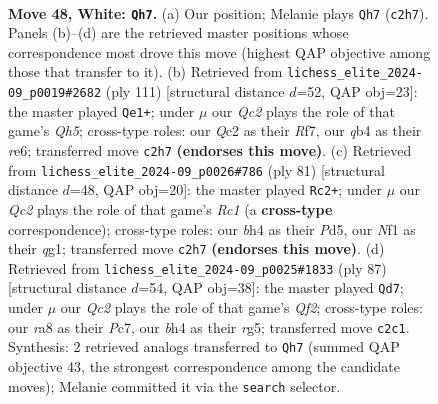 \documentclass[11pt]{article}
\begin{document}
\clearpage

\begin{figure}[p]\centering
\begin{subfigure}{0.46\textwidth}\centering
\resizebox{\linewidth}{!}{%
\newchessgame
\chessboard[
  setfen={r5r1/p2k2p1/7p/3p3P/pq1P2Pb/4P3/2Q3K1/5N2 w - - 4 48},
  showmover=false,
  pgfstyle=straightmove, color=movearrow, markmove={c2-h7}
]}
\caption{}
\end{subfigure}\hfill
\begin{subfigure}{0.46\textwidth}\centering
\resizebox{\linewidth}{!}{%
\newchessgame
\chessboard[
  setfen={8/k4r2/p3RP1p/3p4/P1pP3q/2P1P3/6R1/6K1 b - - 4 56},
  showmover=false,
  pgfstyle=straightmove, color=movearrow, markmove={h4-e1}
]}
\caption{}
\end{subfigure}
\\[4pt]
\begin{subfigure}{0.46\textwidth}\centering
\resizebox{\linewidth}{!}{%
\newchessgame
\chessboard[
  setfen={2r3k1/1p4p1/4p2p/pP1p4/P4P1P/6Pq/4K3/R5Q1 b - - 0 41},
  showmover=false,
  pgfstyle=straightmove, color=movearrow, markmove={c8-c2}
]}
\caption{}
\end{subfigure}\hfill
\begin{subfigure}{0.46\textwidth}\centering
\resizebox{\linewidth}{!}{%
\newchessgame
\chessboard[
  setfen={5k2/1pp2q2/p2p4/P2P2R1/1P4P1/2PQ4/6K1/4R3 b - - 0 44},
  showmover=false,
  pgfstyle=straightmove, color=movearrow, markmove={f7-d7}
]}
\caption{}
\end{subfigure}
\caption{\textbf{Move 48, White: \texttt{Qh7}.} (a) Our position; Melanie plays \texttt{Qh7} (\texttt{c2h7}). Panels (b)--(d) are the retrieved master positions whose correspondence most drove this move (highest QAP objective among those that transfer to it). (b) Retrieved from \texttt{lichess\_elite\_2024-09\_p0019\#2682} (ply 111) [structural distance $d$=52, QAP obj=23]: the master played \texttt{Qe1+}; under $\mu$ our \emph{Qc2} plays the role of that game's \emph{Qh5}; cross-type roles: our \emph{Q}c2 as their \emph{R}f7, our \emph{q}b4 as their \emph{r}e6; transferred move \texttt{c2h7} \textbf{(endorses this move)}. (c) Retrieved from \texttt{lichess\_elite\_2024-09\_p0026\#786} (ply 81) [structural distance $d$=48, QAP obj=20]: the master played \texttt{Rc2+}; under $\mu$ our \emph{Qc2} plays the role of that game's \emph{Rc1} (a \textbf{cross-type} correspondence); cross-type roles: our \emph{b}h4 as their \emph{P}d5, our \emph{N}f1 as their \emph{q}g1; transferred move \texttt{c2h7} \textbf{(endorses this move)}. (d) Retrieved from \texttt{lichess\_elite\_2024-09\_p0025\#1833} (ply 87) [structural distance $d$=54, QAP obj=38]: the master played \texttt{Qd7}; under $\mu$ our \emph{Qc2} plays the role of that game's \emph{Qf2}; cross-type roles: our \emph{r}a8 as their \emph{P}c7, our \emph{b}h4 as their \emph{r}g5; transferred move \texttt{c2c1}. Synthesis: 2 retrieved analogs transferred to \texttt{Qh7} (summed QAP objective 43, the strongest correspondence among the candidate moves); Melanie committed it via the \texttt{search} selector.}
\label{fig:thought-m94}
\end{figure}
\end{document}
